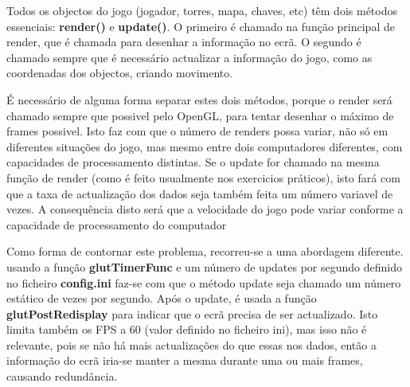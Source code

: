 Todos os objectos do jogo (jogador, torres, mapa, chaves, etc) têm dois métodos essenciais: \textbf{render()} e \textbf{update()}. O primeiro é chamado na função principal de render, que é chamada para desenhar a informação no ecrã.
O segundo é chamado sempre que é necessário actualizar a informação do jogo, como as coordenadas dos objectos, criando movimento.

É necessário de alguma forma separar estes dois métodos, porque o render será chamado sempre que possivel pelo OpenGL, para tentar desenhar o máximo de frames possivel. Isto faz com que o número de renders possa variar, não só em diferentes situações do jogo, mas mesmo entre dois computadores diferentes, com capacidades de processamento distintas.
Se o update for chamado na mesma função de render (como é feito usualmente nos exercicios práticos), isto fará com que a taxa de actualização dos dados seja também feita um número variavel de vezes.
A consequência disto será que a velocidade do jogo pode variar conforme a capacidade de processamento do computador

Como forma de contornar este problema, recorreu-se a uma abordagem diferente. usando a função \textbf{glutTimerFunc} e um número de updates por segundo definido no ficheiro \textbf{config.ini} faz-se com que o método update seja chamado um número estático de vezes por segundo. Após o update, é usada a função \textbf{glutPostRedisplay} para indicar que o ecrã precisa de ser actualizado. Isto limita também os FPS a 60 (valor definido no ficheiro ini), mas isso não é relevante, pois se não há mais actualizações do que essas nos dados, então a informação do ecrã iria-se manter a mesma durante uma ou mais frames, causando redundância.
